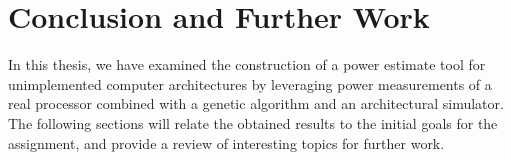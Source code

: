\chapter{Conclusion and Further Work}

In this thesis, we have examined the construction of a power estimate tool for
unimplemented computer architectures by leveraging power measurements of a real
processor combined with a genetic algorithm and an architectural simulator. The
following sections will relate the obtained results to the initial goals for the
assignment, and provide a review of interesting topics for further work.



